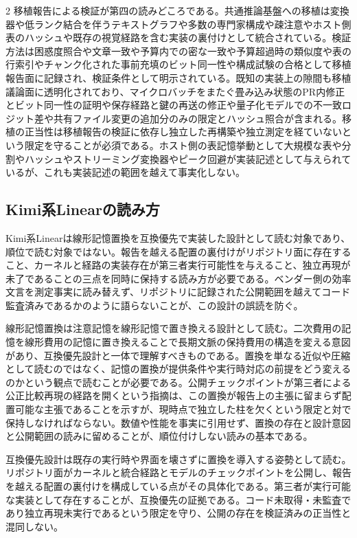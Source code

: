 \documentclass[lualatex,a4paper,10pt]{jlreq}
\begin{document}
\begin{multicols}{2}
移植報告による検証が第四の読みどころである。共通推論基盤への移植は変換器や低ランク結合を伴うテキストグラフや多数の専門家構成や疎注意やホスト側表のハッシュや既存の視覚経路を含む実装の裏付けとして統合されている\autocite{qwenpr}。検証方法は困惑度照合や文章一致や予算内での密な一致や予算超過時の類似度や表の行索引やチャンク化された事前充填のビット同一性や構成試験の合格として移植報告面に記録され、検証条件として明示されている\autocite{qwenpr}。既知の実装上の隙間も移植議論面に透明化されており、マイクロバッチをまたぐ畳み込み状態のPR内修正とビット同一性の証明や保存経路と鍵の再送の修正や量子化モデルでの不一致ロジット差や共有ファイル変更の追加分のみの限定とハッシュ照合が含まれる\autocite{qwenpr}。移植の正当性は移植報告の検証に依存し独立した再構築や独立測定を経ていないという限定を守ることが必須である\autocite{qwenpr}。ホスト側の表記憶挙動として大規模な表や分割やハッシュやストリーミング変換器やピーク回避が実装記述として与えられているが、これも実装記述の範囲を越えて事実化しない\autocite{qwenpr}。

\subsection{Kimi系Linearの読み方}
Kimi系Linearは線形記憶置換を互換優先で実装した設計として読む対象であり、順位で読む対象ではない。報告を越える配置の裏付けがリポジトリ面に存在すること、カーネルと経路の実装存在が第三者実行可能性を与えること、独立再現が未了であることの三点を同時に保持する読み方が必要である\autocite{kimigithub}\autocite{kda}。ベンダー側の効率文言を測定事実に読み替えず、リポジトリに記録された公開範囲を越えてコード監査済みであるかのように語らないことが、この設計の誤読を防ぐ。

線形記憶置換は注意記憶を線形記憶で置き換える設計として読む。二次費用の記憶を線形費用の記憶に置き換えることで長期文脈の保持費用の構造を変える意図があり、互換優先設計と一体で理解すべきものである\autocite{kimigithub}\autocite{kda}。置換を単なる近似や圧縮として読むのではなく、記憶の置換が提供条件や実行時対応の前提をどう変えるのかという観点で読むことが必要である。公開チェックポイントが第三者による公正比較再現の経路を開くという指摘は、この置換が報告上の主張に留まらず配置可能な主張であることを示すが、現時点で独立した柱を欠くという限定と対で保持しなければならない\autocite{kimigithub}。数値や性能を事実に引用せず、置換の存在と設計意図と公開範囲の読みに留めることが、順位付けしない読みの基本である。

互換優先設計は既存の実行時や界面を壊さずに置換を導入する姿勢として読む。リポジトリ面がカーネルと統合経路とモデルのチェックポイントを公開し、報告を越える配置の裏付けを構成している点がその具体化である\autocite{kimigithub}。第三者が実行可能な実装として存在することが、互換優先の証拠である。コード未取得・未監査であり独立再現未実行であるという限定を守り、公開の存在を検証済みの正当性と混同しない\autocite{kimigithub}\autocite{kda}。


\end{multicols}
\end{document}
